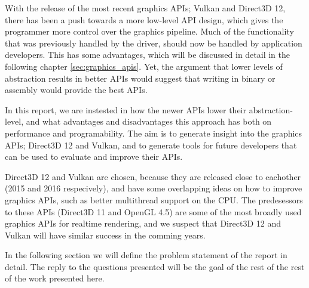 With the release of the most recent graphics \glspl{API}; Vulkan and Direct3D 12, there has been a push towards a more low-level API design, which gives the programmer more control over the graphics pipeline.
Much of the functionality that was previously handled by the driver, should now be handled by application developers. 
This has some advantages, which will be discussed in detail in the following chapter \cref{sec:graphics_apis}.
Yet, the argument that lower levels of abstraction results in better \glspl{API} would suggest that writing in binary or assembly would provide the best \glspl{API}.

In this report, we are instested in how the newer \glspl{API} lower their abstraction-level, and what advantages and disadvantages this approach has both on performance and programability.
The aim is to generate insight into the graphics \glspl{API}; Direct3D 12 and Vulkan, and to generate tools for future developers that can be used to evaluate and improve their \glspl{API}.

Direct3D 12 and Vulkan are chosen, because they are released close to eachother (2015 and 2016 respecively), and have some overlapping ideas on how to improve graphics \glspl{API}, such as better multithread support on the CPU.
The predesessors to these \glspl{API} (Direct3D 11 and OpenGL 4.5) are some of the most broadly used graphics \glspl{API} for realtime rendering, and we suspect that Direct3D 12 and Vulkan will have similar success in the comming years.

In the following section we will define the problem statement of the report in detail.
The reply to the questions presented will be the goal of the rest of the rest of the work presented here.


